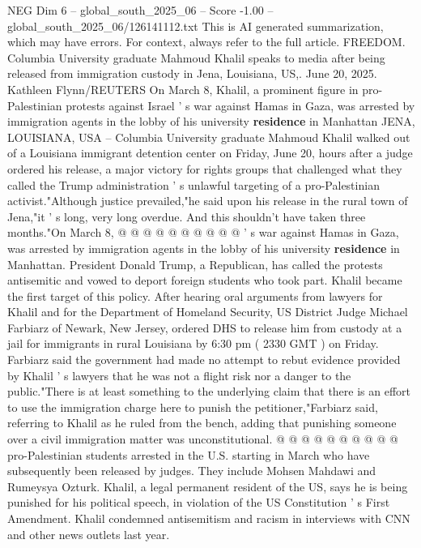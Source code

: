 \begin{textsample}{NEG Dim 6 – global\_south\_2025\_06 – Score -1.00 – global\_south\_2025\_06/126141112.txt}  \label{ex:f6_neg_438}
This is AI generated summarization, which may have errors.
For context, always refer to the full article.
FREEDOM.
Columbia University graduate Mahmoud Khalil speaks to media after being released from immigration custody in Jena, Louisiana, US,.
June 20, 2025.
Kathleen Flynn/REUTERS On March 8, Khalil, a prominent figure in pro-Palestinian protests against Israel ' s war against Hamas in Gaza, was arrested by immigration agents in the lobby of his university \textbf{residence} in Manhattan JENA, LOUISIANA, USA -- Columbia University graduate Mahmoud Khalil walked out of a Louisiana immigrant detention center on Friday, June 20, hours after a judge ordered his release, a major victory for rights groups that challenged what they called the Trump administration ' s unlawful targeting of a pro-Palestinian activist."Although justice prevailed,"he said upon his release in the rural town of Jena,"it ' s long, very long overdue.
And this shouldn't have taken three months."On March 8, @ @ @ @ @ @ @ @ @ @ ' s war against Hamas in Gaza, was arrested by immigration agents in the lobby of his university \textbf{residence} in Manhattan.
President Donald Trump, a Republican, has called the protests antisemitic and vowed to deport foreign students who took part.
Khalil became the first target of this policy.
After hearing oral arguments from lawyers for Khalil and for the Department of Homeland Security, US District Judge Michael Farbiarz of Newark, New Jersey, ordered DHS to release him from custody at a jail for immigrants in rural Louisiana by 6:30 pm ( 2330 GMT ) on Friday.
Farbiarz said the government had made no attempt to rebut evidence provided by Khalil ' s lawyers that he was not a flight risk nor a danger to the public."There is at least something to the underlying claim that there is an effort to use the immigration charge here to punish the petitioner,"Farbiarz said, referring to Khalil as he ruled from the bench, adding that punishing someone over a civil immigration matter was unconstitutional. @ @ @ @ @ @ @ @ @ @ pro-Palestinian students arrested in the U.S. starting in March who have subsequently been released by judges.
They include Mohsen Mahdawi and Rumeysya Ozturk.
Khalil, a legal permanent resident of the US, says he is being punished for his political speech, in violation of the US Constitution ' s First Amendment.
Khalil condemned antisemitism and racism in interviews with CNN and other news outlets last year.

\end{textsample}
